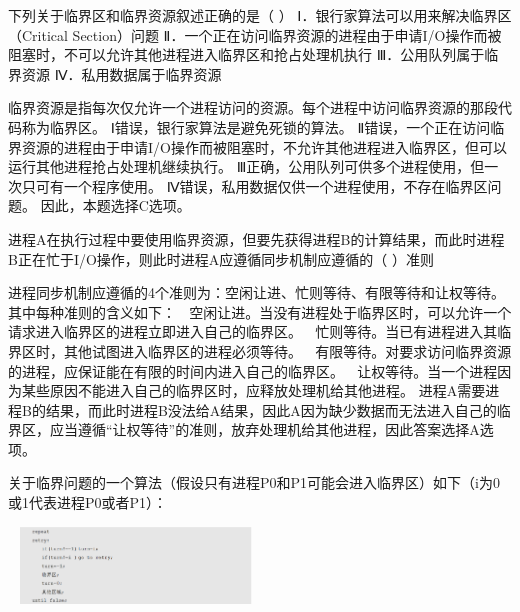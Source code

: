\question 下列关于临界区和临界资源叙述正确的是（ ）
Ⅰ．银行家算法可以用来解决临界区（Critical Section）问题
Ⅱ．一个正在访问临界资源的进程由于申请I/O操作而被阻塞时，不可以允许其他进程进入临界区和抢占处理机执行
Ⅲ．公用队列属于临界资源 Ⅳ．私用数据属于临界资源
\par{}
\begin{solution}临界资源是指每次仅允许一个进程访问的资源。每个进程中访问临界资源的那段代码称为临界区。
Ⅰ错误，银行家算法是避免死锁的算法。
Ⅱ错误，一个正在访问临界资源的进程由于申请I/O操作而被阻塞时，不允许其他进程进入临界区，但可以运行其他进程抢占处理机继续执行。
Ⅲ正确，公用队列可供多个进程使用，但一次只可有一个程序使用。
Ⅳ错误，私用数据仅供一个进程使用，不存在临界区问题。
因此，本题选择C选项。
\end{solution}
\question 进程A在执行过程中要使用临界资源，但要先获得进程B的计算结果，而此时进程B正在忙于I/O操作，则此时进程A应遵循同步机制应遵循的（
）准则
\par{}
\begin{solution}进程同步机制应遵循的4个准则为：空闲让进、忙则等待、有限等待和让权等待。其中每种准则的含义如下：

空闲让进。当没有进程处于临界区时，可以允许一个请求进入临界区的进程立即进入自己的临界区。
 忙则等待。当已有进程进入其临界区时，其他试图进入临界区的进程必须等待。

有限等待。对要求访问临界资源的进程，应保证能在有限的时间内进入自己的临界区。

让权等待。当一个进程因为某些原因不能进入自己的临界区时，应释放处理机给其他进程。
进程A需要进程B的结果，而此时进程B没法给A结果，因此A因为缺少数据而无法进入自己的临界区，应当遵循``让权等待''的准则，放弃处理机给其他进程，因此答案选择A选项。
\end{solution}
\question 关于临界问题的一个算法（假设只有进程P0和P1可能会进入临界区）如下（i为0或1代表进程P0或者P1）：

~
\includegraphics[width=2.42708in,height=0.80208in]{computerassets/00E4058A40E4544DAAE1BEED564B9DB8.png}

